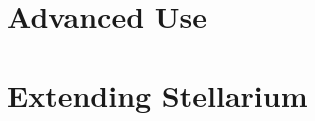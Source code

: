 \documentclass[12pt,fleqn]{book} %
\begin{document}














\part{Advanced Use}



%


\part{Extending Stellarium}




\end{document}
